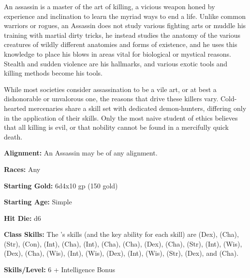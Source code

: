 
An assassin is a master of the art of killing, a vicious weapon honed by experience and inclination to learn the myriad ways to end a life. Unlike common warriors or rogues, an Assassin does not study various fighting arts or muddle his training with martial dirty tricks, he instead studies the anatomy of the various creatures of wildly different anatomies and forms of existence, and he uses this knowledge to place his blows in areas vital for biological or mystical reasons. Stealth and sudden violence are his hallmarks, and various exotic tools and killing methods become his tools.

While most societies consider assassination to be a vile art, or at best a dishonorable or unvalorous one, the reasons that drive these killers vary. Cold-hearted mercenaries share a skill set with dedicated demon-hunters, differing only in the application of their skills. Only the most naive student of ethics believes that all killing is evil, or that nobility cannot be found in a mercifully quick death.

\textbf{Alignment:} An Assassin may be of any alignment.

\textbf{Races:} Any

\textbf{Starting Gold:} 6d4x10 gp (150 gold)

\textbf{Starting Age:} Simple

\textbf{Hit Die:} d6

\textbf{Class Skills:} The \currentclassname{}'s skills (and the key ability for each skill) are  (Dex),  (Cha),  (Str),  (Con),  (Int),  (Cha),  (Int),  (Cha),  (Cha),  (Dex),  (Cha),  (Str),  (Int),  (Wis),  (Dex),  (Cha),  (Wis),  (Int),  (Wis),  (Dex),  (Int),  (Wis),  (Str),  (Dex), and  (Cha).

\textbf{Skills/Level:} 6 + Intelligence Bonus

\modebab{}
\goodfor{}
\goodref{}
\poorwil{}


